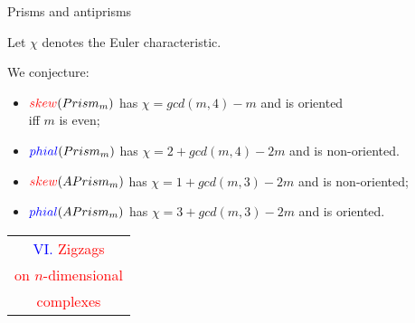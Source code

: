 \documentclass[%
pdf,
colorBG,
slideColor,
]{prosper}
\begin{document}
\begin{slide}{Prisms and antiprisms}

Let $\chi$ denotes the Euler characteristic.

We conjecture:


\begin{itemize}
\item 
$\textcolor{red}{skew}(Prism_m)$ has $\chi=gcd(m,4)-m$ and is oriented\\
iff $m$ is even;

\item $\textcolor{blue}{phial}(Prism_m)$ has $\chi=2+gcd(m,4)-2m$ and is non-oriented.

\vspace{3mm}

\item $\textcolor{red}{skew}(APrism_m)$ has $\chi=1+gcd(m,3)-2m$ and is non-oriented;


\item $\textcolor{blue}{phial}(APrism_m)$ has $\chi=3+gcd(m,3)-2m$ and is oriented.
\end{itemize}


\end{slide}




\begin{slide}{}
\begin{center}
{\Huge 
\begin{tabular*}{8cm}{c}
\\[-0.5cm]
\textcolor{blue}{VI. }\textcolor{red}{Zigzags}\\
\textcolor{red}{on $n$-dimensional}\\
\textcolor{red}{complexes}
\end{tabular*}
}
\end{center}
\end{slide}
\end{document}
